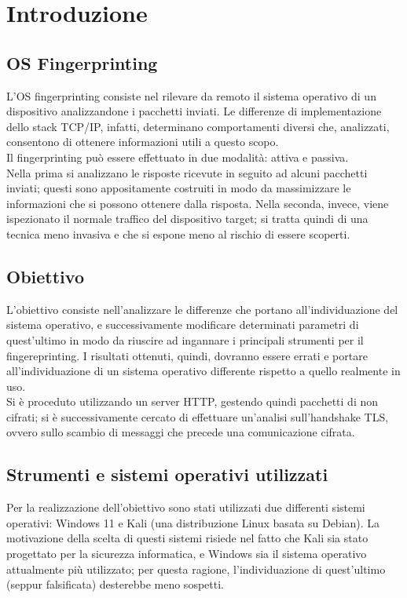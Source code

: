 

\chapter{Introduzione}
\label{introduzione}

\section{OS Fingerprinting}
\label{citazioni}

L'OS fingerprinting consiste nel rilevare da remoto il sistema operativo di un dispositivo analizzandone i pacchetti inviati. Le differenze di implementazione dello stack TCP/IP, infatti, determinano comportamenti diversi che, analizzati, consentono di ottenere informazioni utili a questo scopo. \\
Il fingerprinting può essere effettuato in due modalità: attiva e passiva. \\ 
Nella prima si analizzano le risposte ricevute in seguito ad alcuni pacchetti inviati; questi sono appositamente costruiti in modo da massimizzare le informazioni che si possono ottenere dalla risposta.
Nella seconda, invece, viene ispezionato il normale traffico del dispositivo target; si tratta quindi di una tecnica meno invasiva e che si espone meno al rischio di essere scoperti.

\section{Obiettivo}
L'obiettivo consiste nell'analizzare le differenze che portano all'individuazione del sistema operativo, e successivamente modificare determinati parametri di quest'ultimo in modo da riuscire ad ingannare i principali strumenti per il fingereprinting.
I risultati ottenuti, quindi, dovranno essere errati e portare all'individuazione di un sistema operativo differente rispetto a quello realmente in uso.\\
Si è proceduto utilizzando un server HTTP, gestendo quindi pacchetti di non cifrati; si è successivamente cercato di effettuare un'analisi sull'handshake TLS, ovvero sullo scambio di messaggi che precede una comunicazione cifrata.

\section{Strumenti e sistemi operativi utilizzati}
Per la realizzazione dell'obiettivo sono stati utilizzati due differenti sistemi operativi: Windows 11 e Kali (una distribuzione Linux basata su Debian).
La motivazione della scelta di questi sistemi risiede nel fatto che Kali sia stato progettato per la sicurezza informatica, e Windows sia il sistema operativo attualmente più utilizzato; per questa ragione, l'individuazione di quest'ultimo (seppur falsificata) desterebbe meno sospetti. 

